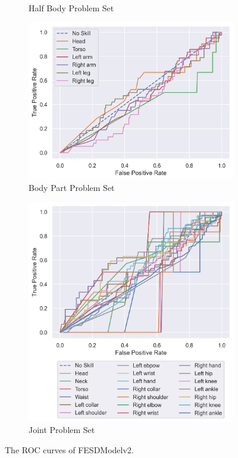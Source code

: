 \begin{figure}[htbp]
\begin{subfigure}[b]{0.4\linewidth}
      \caption[]{Half Body Problem Set}
      \label{fig:hb_roc_v2}
  \end{subfigure}
  \hfill
  \begin{subfigure}[b]{0.4\linewidth}
      \centering
      \includegraphics[width=\textwidth]{figures/Results/v2/roc/bp.png}
      \caption[]{Body Part Problem Set}
      \label{fig:bp_roc_v2}
  \end{subfigure}
  \hfill
  \begin{subfigure}[b]{0.4\linewidth}
      \centering
      \includegraphics[width=\textwidth]{figures/Results/v2/roc/jt.png}
      \caption[]{Joint Problem Set}
      \label{fig:jt_roc_v2}
  \end{subfigure}
  \caption[ROC Curves of FESDModelv2]{The ROC curves of FESDModelv2.}
  \label{fig:roc_v2}
\end{figure}

